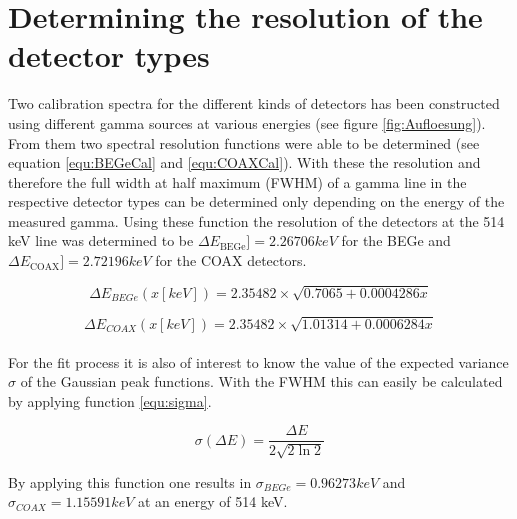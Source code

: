 \appendix

\chapter{Determining the resolution of the detector types}
\label{sec:ResDetermination}


Two calibration spectra for the different kinds of detectors has been constructed using different gamma sources at various energies (see figure \ref{fig:Aufloesung})\cite{agostini_background_2017}.
From them two spectral resolution functions were able to be determined (see equation \ref{equ:BEGeCal} and \ref{equ:COAXCal}).
With these the resolution and therefore the full width at half maximum (FWHM) of a gamma line in the respective detector types can be determined only depending on the energy of the measured gamma.
Using these function the resolution of the detectors at the 514 keV line was determined to be $\Delta E_{\mathrm{BEGe}}] =2.26706\unit{keV}$ for the BEGe and $\Delta E_{\mathrm{COAX}}] = 2.72196\unit{keV}$ for the COAX detectors.



\begin{equation}
\Delta E_{BEGe}(x[keV]) = 2.35482 \times \sqrt{0.7065+0.0004286x}
\label{equ:BEGeCal}
\end{equation}

\begin{equation}
\Delta E_{COAX}(x[keV]) = 2.35482 \times \sqrt{1.01314+0.0006284x}
\label{COAXCal}
\end{equation}
\\

For the fit process it is also of interest to know the value of the expected variance $\sigma$ of the Gaussian peak functions.
With the FWHM this can easily be calculated by applying function \ref{equ:sigma}.

\begin{equation}
\sigma (\Delta E) = \frac{\Delta E}{2\sqrt{2\ln2}}
\label{equ:sigma}
\end{equation}

By applying this function one results in $\sigma_{BEGe} = 0.96273\unit{keV}$ and $\sigma_{COAX} = 1.15591\unit{keV}$ at an energy of 514 keV.

